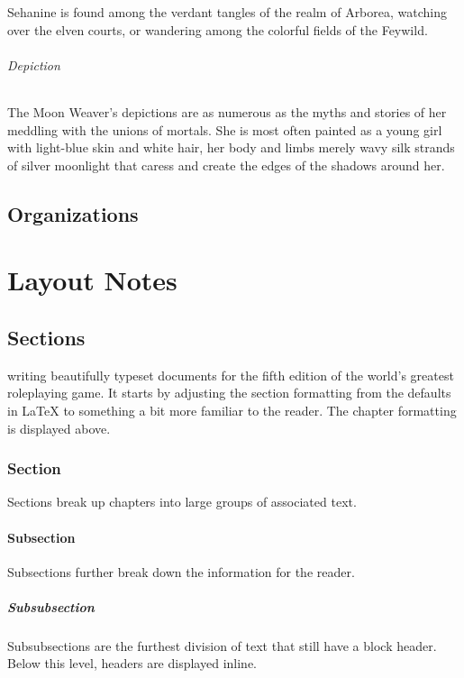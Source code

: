 \documentclass[letterpaper,twocolumn,openany,nodeprecatedcode]{dndbook}
\begin{document}
Sehanine is found among the verdant tangles of the realm of Arborea, watching over the elven
courts, or wandering among the colorful fields of the Feywild.

\paragraph{Depiction}
The Moon Weaver’s depictions are as numerous as the myths and stories of her meddling with
the unions of mortals. She is most often painted as a young girl with light-blue skin and
white hair, her body and limbs merely wavy silk strands of silver moonlight that caress and
create the edges of the shadows around her.

\chapter{Organizations}

\part{Layout Notes}

\chapter{Sections}

 writing beautifully typeset documents for the fifth edition of the world's greatest roleplaying game. It starts by adjusting the section formatting from the defaults in \LaTeX{} to something a bit more familiar to the reader. The chapter formatting is displayed above.

\section{Section}
Sections break up chapters into large groups of associated text.

\subsection{Subsection}
Subsections further break down the information for the reader.

\subsubsection{Subsubsection}
Subsubsections are the furthest division of text that still have a block header. Below this level, headers are displayed inline.
\end{document}
